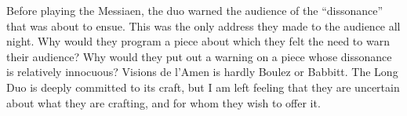 Before playing the Messiaen, the duo warned the audience of the “dissonance” that was about to ensue. This was the only address they made to the audience all night. Why would they program a piece about which they felt the need to warn their audience? Why would they put out a warning on a piece whose dissonance is relatively innocuous? Visions de l'Amen is hardly Boulez or Babbitt. The Long Duo is deeply committed to its craft, but I am left feeling that they are uncertain about what they are crafting, and for whom they wish to offer it.